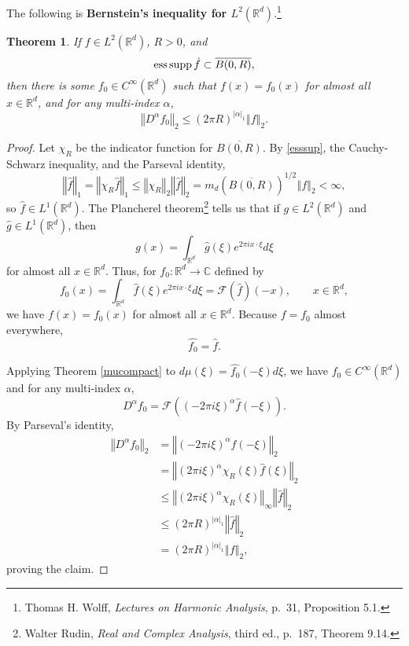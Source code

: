 \documentclass{article}
\newcommand{\ess}{\ensuremath\mathrm{ess}\,}
\newcommand{\supp}{\ensuremath\mathrm{supp}\,}
\newcommand{\norm}[1]{\left\Vert #1 \right\Vert}
\newtheorem{theorem}{Theorem}
\theoremstyle{definition}
\begin{document}
The following is \textbf{Bernstein's inequality for $L^2(\mathbb{R}^d)$}.\footnote{Thomas H. Wolff,
{\em Lectures on Harmonic Analysis}, p.~31, Proposition 5.1.}

\begin{theorem}
If $f \in L^2(\mathbb{R}^d)$, $R>0$, and 
\begin{equation}
\ess \supp \hat{f} \subset \overline{B(0,R)},
\label{esssup}
\end{equation}
then there is some $f_0 \in C^\infty(\mathbb{R}^d)$ such that $f(x)=f_0(x)$ for almost all $x \in \mathbb{R}^d$,
and for any multi-index $\alpha$,
\[
\norm{D^\alpha f_0}_2 \leq (2\pi R)^{|\alpha|_1} \norm{f}_2.
\]
\end{theorem}
\begin{proof}
Let $\chi_R$ be the indicator function for  $\overline{B(0,R)}$. By \eqref{esssup}, the Cauchy-Schwarz inequality, and the Parseval identity,
\[
\norm{\hat{f}}_1 =  \norm{\chi_R \hat{f}}_1 \leq \norm{\chi_R}_2 \norm{\hat{f}}_2
=m_d(\overline{B(0,R)})^{1/2} \norm{f}_2
< \infty,
\]
so $\hat{f} \in L^1(\mathbb{R}^d)$.
The Plancherel theorem\footnote{Walter Rudin, {\em Real and Complex Analysis}, third ed., p.~187, Theorem 9.14.}
 tells us that if
$g \in L^2(\mathbb{R}^d)$ and $\hat{g} \in L^1(\mathbb{R}^d)$, then
\[
g(x) = \int_{\mathbb{R}^d} \hat{g}(\xi) e^{2\pi ix\cdot \xi} d\xi
\]
for almost all $x \in \mathbb{R}^d$. 
Thus, for
 $f_0:\mathbb{R}^d \to \mathbb{C}$ defined by
\[
f_0(x) = \int_{\mathbb{R}^d} \hat{f}(\xi) e^{2\pi ix \cdot \xi} d\xi=\mathscr{F}(\hat{f})(-x), \qquad
x \in \mathbb{R}^d,
\]
we have $f(x)=f_0(x)$ for almost all $x \in \mathbb{R}^d$. Because $f=f_0$ almost everywhere,
\[
\widehat{f_0}=\hat{f}.
\]

Applying Theorem \ref{mucompact} to $d\mu(\xi)=\widehat{f_0}(-\xi) d\xi$, 
we have $f_0 \in C^\infty(\mathbb{R}^d)$ and for any multi-index $\alpha$,
\[
D^\alpha f_0 = \mathscr{F}((-2\pi i\xi)^\alpha \hat{f}(-\xi)).
\]
By Parseval's identity,
\begin{align*}
\norm{D^\alpha f_0}_2&=\norm{(-2\pi i\xi)^\alpha \hat{f}(-\xi)}_2\\
&=\norm{(2\pi i\xi)^\alpha \chi_R(\xi) \hat{f}(\xi)}_2\\
&\leq \norm{(2\pi i\xi)^\alpha \chi_R(\xi)}_\infty \norm{\hat{f}}_2\\
&\leq (2\pi R)^{|\alpha|_1} \norm{\hat{f}}_2\\
&= (2\pi R)^{|\alpha|_1} \norm{f}_2,
\end{align*}
proving the claim.
\end{proof}
\end{document}

